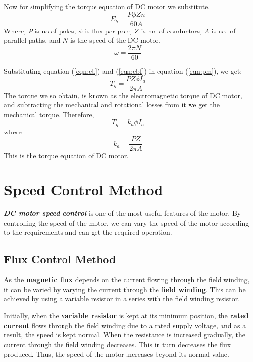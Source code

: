 \documentclass{article}
\begin{document}
Now for simplifying the torque equation of DC motor we substitute.
  \begin{equation}
  \label{eqn:ebf}
    E_b=\frac{P \phi Zn}{60A}
\end{equation}
Where, $P$ is no of poles,
$\phi$ is flux per pole,
$Z$ is no. of conductors,
$A$ is no. of parallel paths,
and $N$ is the speed of the DC motor.
 \begin{equation}
    \omega = \frac{2\pi N}{60} 
\end{equation}
 
Substituting equation (\ref{eqn:eb}) and (\ref{eqn:ebf}) in equation (\ref{eqn:pm}), we get:
 \begin{equation}
   T_g = \frac{ PZ \phi I_a} {2\pi A} 
\end{equation}
The torque we so obtain, is known as the electromagnetic torque of DC motor, and subtracting the mechanical and rotational losses from it we get the mechanical torque.
Therefore,
 \begin{equation}
   T_g =  k_a\phi I_a
\end{equation}
where
 \begin{equation}
k_a = \frac{PZ} {2\pi A}
\end{equation}
This is the torque equation of DC motor.
 \section {Speed Control Method}
\textit{ \textbf{DC motor speed control} }is one of the most useful features of the motor. By controlling the speed of the motor, we can vary the speed of the motor according to the requirements and can get the required operation.
 \subsection {Flux Control Method}
 As the\textbf{ magnetic flux} depends on the current flowing through the field winding, it can be varied by varying the current through the \textbf{field winding}. This can be achieved by using a variable resistor in a series with the field winding resistor.

Initially, when the \textbf{variable resistor} is kept at its minimum position, the \textbf{rated current} flows through the field winding due to a rated supply voltage, and as a result, the speed is kept normal. When the resistance is increased gradually, the current through the field winding decreases. This in turn decreases the flux produced. Thus, the speed of the motor increases beyond its normal value.
 
\end{document}
